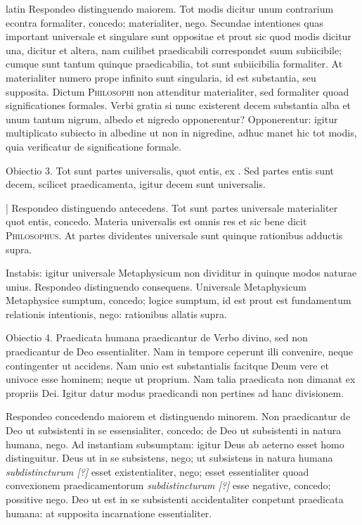 \begin{otherlanguage*}{latin}
\pstart
Respondeo distinguendo maiorem. Tot modis dicitur unum contrarium econtra formaliter, concedo; materialiter, nego. Secundae intentiones quas important universale et singulare sunt oppositae et prout sic quod modis dicitur una, dicitur et altera, nam cuilibet praedicabili correspondet suum subiicibile; cumque sunt tantum quinque praedicabilia, tot sunt subiicibilia formaliter. At materialiter numero prope infinito sunt singularia, id est substantia, seu supposita. Dictum \textsc{Philosophi} non attenditur materialiter, sed formaliter quoad significationes formales. Verbi gratia si nunc existerent decem substantia alba et unum tantum nigrum, albedo et nigredo opponerentur? Opponerentur:
igitur multiplicato subiecto in albedine ut non in nigredine, adhuc manet hic tot modis, quia verificatur de significatione formale. 
\pend

\pstart
Obiectio 3. Tot sunt partes universalis, quot entis, ex . Sed partes entis sunt decem, scilicet praedicamenta, igitur decem sunt universalis. 
\pend

\pstart
\textnormal{|} Respondeo distinguendo antecedens. Tot sunt partes universale materialiter quot entis, concedo. Materia universalis est omnis res et sic bene dicit \textsc{Philosophus}. At partes dividentes universale sunt quinque rationibus adductis supra. 
\pend

\pstart
Instabis:
igitur universale Metaphysicum non dividitur in quinque modos naturae unius. Respondeo distinguendo consequens. Universale Metaphysicum Metaphysice sumptum, concedo; logice sumptum, id est prout est fundamentum relationis intentionis, nego:
rationibus allatis supra. 
\pend

\pstart
Obiectio 4. Praedicata humana praedicantur de Verbo divino, sed non praedicantur de Deo essentialiter. Nam in tempore ceperunt illi convenire, neque contingenter ut accidens. Nam unio est substantialis facitque Deum vere et univoce esse hominem; neque ut proprium. Nam talia praedicata non dimanat ex propriis Dei. Igitur datur modus praedicandi non pertines ad hanc divisionem. 
\pend

\pstart
Respondeo concedendo maiorem et distinguendo minorem. Non praedicantur de Deo ut subsistenti in se essensialiter, concedo; de Deo ut subsistenti in natura humana, nego. Ad instantiam subsumptam:
igitur Deus ab aeterno esset homo distinguitur. Deus ut in se subsistens, nego; ut subsistens in natura humana \emph{subdistincturum [?]} esset existentialiter, nego; esset essentialiter quoad convexionem praedicamentorum \emph{subdistincturum [?]} esse negative, concedo; possitive nego. Deo ut est in se subsistenti accidentaliter conpetunt praedicata humana:
at supposita incarnatione essentialiter. 
\pend


\end{otherlanguage*}
